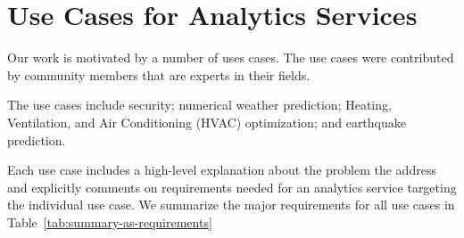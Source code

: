 

\section{Use Cases for Analytics Services}
\label{sec:usecases}

Our work is motivated by a number of uses cases. The use cases were
contributed by community members that are experts in their fields.


The use cases include security; numerical weather prediction; 
Heating, Ventilation, and Air Conditioning (HVAC) optimization; and earthquake prediction. 


Each use case includes a high-level explanation about the problem the address and 
explicitly comments on requirements needed for an analytics service targeting the individual use case.
We summarize the major requirements for all use cases in Table~\ref{tab:summary-as-requirements}


